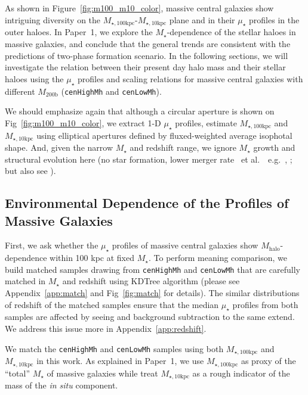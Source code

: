 \documentclass[a4paper,fleqn,usenatbib]{mnras}
\def\etal{{\ et al.~}}
\def\rbcg{\texttt{cenHighMh}}
\def\nbcg{\texttt{cenLowMh}}
\def\mstar{{$M_{\star}$}}
\def\mhalo{{$M_{\mathrm{halo}}$}}
\def\minn{{$M_{\star,10\mathrm{kpc}}$}}
\def\mtot{{$M_{\star,100\mathrm{kpc}}$}}
\def\mden{{$\mu_{\star}$}}
\begin{document}
    As shown in Figure~\ref{fig:m100_m10_color}, massive central galaxies show 
    intriguing diversity on the \mtot{}-\minn{} plane and in their \mden{} profiles 
    in the outer haloes.  
    In Paper~1, we explore the \mstar{}-dependence of the stellar haloes in massive 
    galaxies, and conclude that the general trends are consistent with the 
    predictions of two-phase formation scenario. 
    In the following sections, we will investigate the relation between their 
    present day halo mass and their stellar haloes using the \mden{} profiles and 
    scaling relations for massive central galaxies with different $M_{\mathrm{200b}}$ 
    (\rbcg{} and \nbcg{}).
    
    We should emphasize again that although a circular aperture is shown on 
    Fig~\ref{fig:m100_m10_color}, we extract 1-D \mden{} profiles, estimate 
    \mtot{} and \minn{} using elliptical apertures defined by fluxed-weighted average 
    isophotal shape. 
    And, given the narrow \mstar{} and redshift range, we ignore \mstar{} growth 
    and structural evolution here
    (no star formation, lower merger rate \etal~e.g.\ \citealt{Bellstedt2016},
    \citealt{Inagaki2015}; but also see \citealt{Bai2014}). 

\subsection{Environmental Dependence of the Profiles of Massive Galaxies}
    \label{ssec:sbp_mtot} 
       
    First, we ask whether the \mden{} profiles of massive central galaxies show 
    \mhalo{}-dependence within 100 kpc at fixed \mstar{}. 
    To perform meaning comparison, we build matched samples drawing from \rbcg{} and 
    \nbcg{} that are carefully matched in \mstar{} and redshift using KDTree algorithm 
    (please see Appendix~\ref{app:match} and Fig~\ref{fig:match} for details). 
    The similar distributions of redshift of the matched samples ensure that the 
    median \mden{} profiles from both samples are affected by seeing and background 
    subtraction to the same extend. 
    We address this issue more in Appendix~\ref{app:redshift}. 
    
    We match the \rbcg{} and \nbcg{} samples using both \mtot{} and \minn{} in this
    work. 
    As explained in Paper~1, we use \mtot{} as proxy of the ``total'' \mstar{}
    of massive galaxies while treat \minn{} as a rough indicator of the mass of the 
    \textit{in situ} component. 
    
\end{document}
